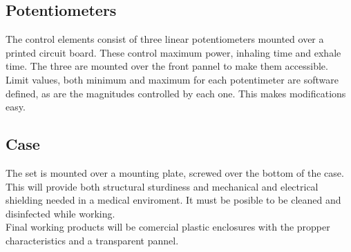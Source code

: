 \subsection{Potentiometers}
    The control elements consist of three linear potentiometers mounted over a printed circuit board. These control maximum power, inhaling time and exhale time. The three are mounted over the front pannel to make them accessible.\\
    
    Limit values, both minimum and maximum for each potentimeter are software defined, as are the magnitudes controlled by each one. This makes modifications easy.

\subsection{Case}
    The set is mounted over a mounting plate, screwed over the bottom of the case. This will provide both structural sturdiness and mechanical and electrical shielding needed in a medical enviroment. It must be posible to be cleaned and disinfected while working.\\ 
    
    Final working products will be comercial plastic enclosures with the propper characteristics and a transparent pannel.
